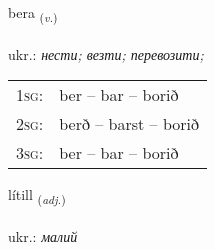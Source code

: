 \documentclass[frontgrid, backgrid]{flacards}\usepackage[]{graphicx}\usepackage[]{xcolor}
\begin{document}
\renewcommand{\blhead}{\vskip5pt {\small\bfseries\footnotesize Sagnorð | дієслово }}
\renewcommand{\bcfoot}{\vskip5pt \hspace{2pt}{\small\bfseries\footnotesize 1K}}


{bera \small{\textsubscript{(\textit{v.})}} \\[1ex] %
\textphonetic{[pɛːra]} \\
ukr.: \emph{нести; везти; перевозити;} \\  [2ex]
\renewcommand*{\arraystretch}{0.8}
\begin{tabular}{p{1cm}l}
\textsc{1sg}: & ber -- bar -- borið \\ 
\textsc{2sg}: & berð -- barst -- borið \\ 
\textsc{3sg}: & ber -- bar -- borið \\ 
\end{tabular}
}

\renewcommand{\flhead}{\vskip5pt \fboxsep=0pt {\small\bfseries\footnotesize Lýsingarorð | прикметник}}
\renewcommand{\fcfoot}{\vskip5pt \fboxsep=0pt \hspace{2pt}{\small\bfseries\footnotesize 1K}}

\renewcommand{\blhead}{\vskip5pt {\small\bfseries\footnotesize Lýsingarorð | прикметник }}
\renewcommand{\bcfoot}{\vskip5pt \hspace{2pt}{\small\bfseries\footnotesize 1K}}


{lítill \small{\textsubscript{(\textit{adj.})}} \\[1ex] %
\textphonetic{[liːtɪtl̥]} \\
ukr.: \emph{малий} \\  [2ex]
\renewcommand*{\arraystretch}{0.8}
}
\end{document}
